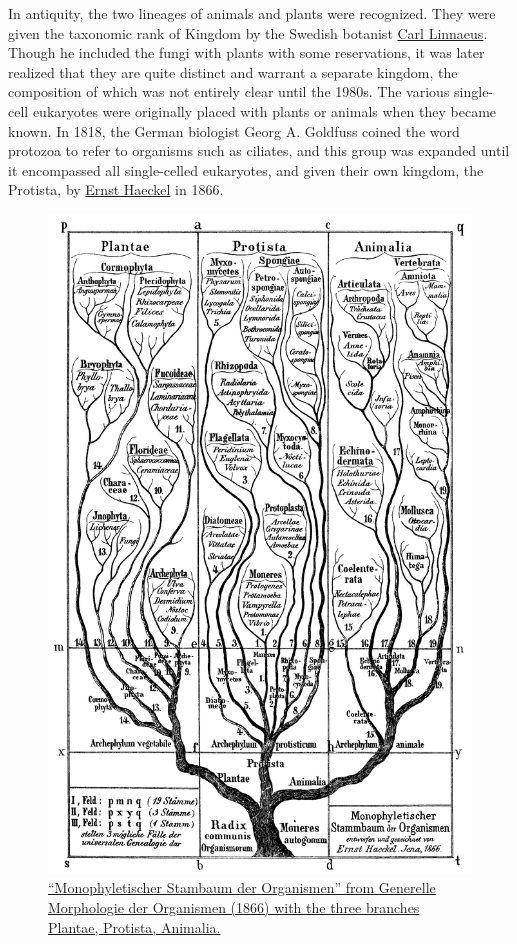 In antiquity, the two lineages of animals and plants were recognized. They were given the taxonomic rank of Kingdom by the Swedish botanist \href{https://en.wikipedia.org/wiki/Carl_Linnaeus}{Carl Linnaeus}. Though he included the fungi with plants with some reservations, it was later realized that they are quite distinct and warrant a separate kingdom, the composition of which was not entirely clear until the 1980s. The various single-cell eukaryotes were originally placed with plants or animals when they became known. In 1818, the German biologist Georg A. Goldfuss coined the word protozoa to refer to organisms such as ciliates, and this group was expanded until it encompassed all single-celled eukaryotes, and given their own kingdom, the Protista, by \href{https://en.wikipedia.org/wiki/Ernst_Haeckel}{Ernst Haeckel} in 1866.



\begin{figure}

{\centering \includegraphics[width=0.7\linewidth]{./figures/protista/Haeckel_arbol_bn} 

}

\caption{\href{https://commons.wikimedia.org/wiki/File:Haeckel_arbol_bn.png}{``Monophyletischer Stambaum der Organismen'' from Generelle Morphologie der Organismen (1866) with the three branches Plantae, Protista, Animalia.}}\label{fig:haeckel3kingdoms}
\end{figure}

